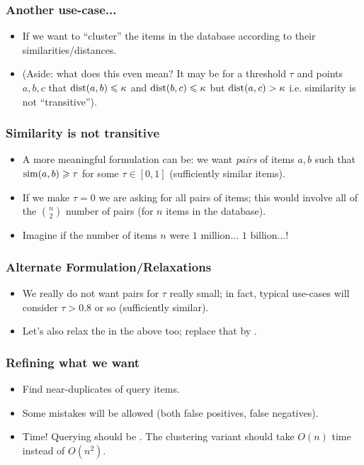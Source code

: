 \documentclass{beamer}
\begin{document}
\begin{frame}
\frametitle{Another use-case...}
\begin{itemize}
\item If we want to ``cluster'' the items in the database according to their similarities/distances. 
\pause 
\item (Aside: what does this even mean? It may be for a threshold $\tau$ and points $a, b, c$ that $\mathrm{dist}(a, b) \leqslant \kappa$ and $\mathrm{dist}(b, c) \leqslant \kappa$ but $\mathrm{dist}(a, c) > \kappa$ i.e. similarity is not ``transitive'').
\end{itemize}
\end{frame}

\begin{frame}
\frametitle{Similarity is not transitive}
\begin{itemize}
\item A more meaningful formulation can be: we want  {\em pairs} of items $a, b$ such that $\mathrm{sim}(a, b)\geqslant \tau$ for some $\tau \in [0, 1]$ (sufficiently similar items).
\pause
\item If we make $\tau = 0$ we are asking for all pairs of items; this would involve all of the $\binom{n}{2}$ number of pairs (for $n$ items in the database).
\pause
\item Imagine if the number of items $n$ were \pause $1$ million... \pause $1$ billion...!
\end{itemize}
\end{frame}

\begin{frame}
\frametitle{Alternate Formulation/Relaxations}
\begin{itemize}
\item We really do not want  pairs for $\tau$ really small; in fact, typical use-cases will consider $\tau > 0.8$ or so (sufficiently similar).
\item Let's also relax the  in the above too; replace that by .
\end{itemize}
\end{frame}

\begin{frame}
\frametitle{Refining what we want}
\begin{itemize}
\item Find near-duplicates of query items.
\item Some mistakes will be allowed (both false positives, false negatives). 
\item Time! Querying should be . The clustering variant should take $O(n)$ time instead of $O(n^2)$. 
\end{itemize}
\end{frame}
\end{document}
